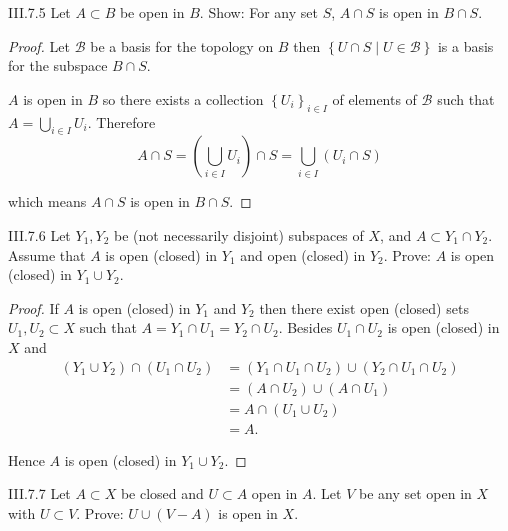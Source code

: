 \begin{problem}{III.7.5}
Let \(A \subset B\) be open in \(B\). Show: For any set \( S \), \( A \cap S \) is open in \( B \cap S \).
\end{problem}

\begin{proof}
	Let \( \mathscr{B} \) be a basis for the topology on \(B\) then \( \left\{ U \cap S \mid U \in \mathscr{B} \right\} \) is a basis for the subspace \( B \cap S \).

	\( A \) is open in \( B \) so there exists a collection \( {\left\{ U_{i} \right\}}_{i\in I} \) of elements of \( \mathscr{B} \) such that \( A = \bigcup_{i\in I} U_{i} \). Therefore
	\[
		A \cap S = \left(\bigcup_{i\in I} U_{i}\right) \cap S = \bigcup_{i\in I} (U_{i} \cap S)
	\]

	which means \( A \cap S \) is open in \( B \cap S \).
\end{proof}

\begin{problem}{III.7.6}
Let \( Y_{1}, Y_{2} \) be (not necessarily disjoint) subspaces of \(X\), and \( A \subset Y_{1} \cap Y_{2} \). Assume that \( A \) is open (closed) in \(Y_{1}\) and open (closed) in \(Y_{2}\). Prove: \( A \) is open (closed) in \( Y_{1} \cup Y_{2} \).
\end{problem}

\begin{proof}
	If \( A \) is open (closed) in \( Y_{1} \) and \( Y_{2} \) then there exist open (closed) sets \( U_{1}, U_{2} \subset X \) such that \( A = Y_{1} \cap U_{1} = Y_{2} \cap U_{2} \). Besides \( U_{1} \cap U_{2} \) is open (closed) in \(X\) and
	\begingroup
	\allowdisplaybreaks%
	\begin{align*}
		(Y_{1} \cup Y_{2}) \cap (U_{1} \cap U_{2}) & = (Y_{1} \cap U_{1} \cap U_{2}) \cup (Y_{2} \cap U_{1} \cap U_{2}) \\
		                                           & = (A \cap U_{2}) \cup (A \cap U_{1})                               \\
		                                           & = A \cap (U_{1} \cup U_{2})                                        \\
		                                           & = A.
	\end{align*}
	\endgroup

	Hence \( A \) is open (closed) in \( Y_{1} \cup Y_{2} \).
\end{proof}

\begin{problem}{III.7.7}
Let \(A \subset X\) be closed and \( U \subset A \) open in \(A\). Let \(V\) be any set open in \(X\) with \( U \subset V \). Prove: \( U \cup (V - A) \) is open in \(X\).
\end{problem}

